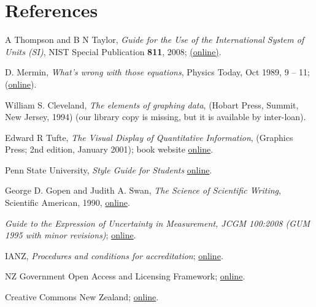 \section{References}

\begingroup
\renewcommand{\section}[2]{}%

\begin{thebibliography}{9}
A Thompson and B N Taylor, \textit{Guide for the Use of the International System of Units (SI)}, NIST Special Publication \textbf{811}, 2008; \href{http://www.nist.gov/pml/pubs/sp811/index.cfm}{(online)}.

D. Mermin, \textit{What’s wrong with those equations}, Physics Today, Oct 1989, 9 – 11; (\href{http://home.sandiego.edu/~severn/p480w/mathprose.pdf}{online}). 

William S. Cleveland, \textit{The elements of graphing data}, (Hobart Press, Summit, New Jersey, 1994) (our library copy is missing, but it is available by inter-loan).

Edward R Tufte, \textit{The Visual Display of Quantitative Information}, (Graphics Press; 2nd edition, January 2001); book website \href{http://www.edwardtufte.com/tufte/books_vdqi}{online}.

Penn State University, \textit{Style Guide for Students} \href{https://www.e-education.psu.edu/styleforstudents/}{online}.

George D. Gopen and Judith A. Swan, \textit{The Science of Scientific Writing}, Scientific American, 1990, \href{https://www.e-education.psu.edu/styleforstudents/c10_p6.html}{online}.

 \textit{Guide to the Expression of Uncertainty in Measurement, JCGM 100:2008 (GUM 1995 with minor revisions)}; \href{http://www.bipm.org/utils/common/documents/jcgm/JCGM_100_2008_E.pdf}{online}.

 IANZ, \textit{Procedures and conditions for accreditation}; \href{http://www.ianz.govt.nz/resources/documents-2/supplementary-criteria/}{online}.

 NZ Government Open Access and Licensing Framework; \href{https://www.ict.govt.nz/guidance-and-resources/open-government/new-zealand-government-open-access-and-licensing-nzgoal-framework}{online}.

 Creative Commons New Zealand; \href{https://www.tohatoha.org.nz/creative-commons/}{online}. 

\end{thebibliography}
\endgroup